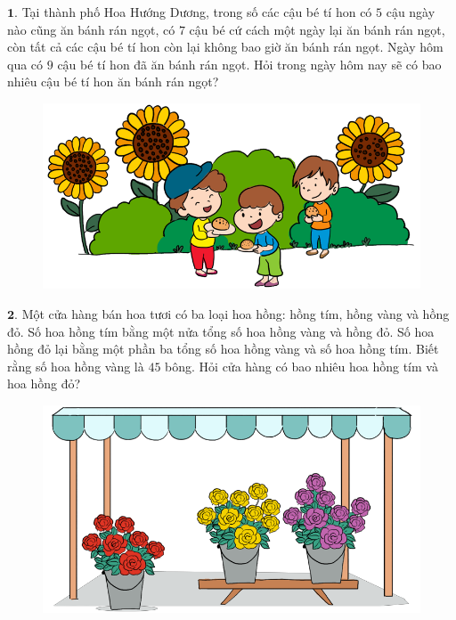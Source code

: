 \begin{multicols}{2}
	$\pmb{1.}$ 	Tại thành phố Hoa Hướng Dương, trong số các cậu bé tí hon có $5$ cậu ngày nào cũng ăn bánh rán ngọt, có $7$ cậu bé cứ cách một ngày lại ăn bánh rán ngọt, còn tất cả các cậu bé tí hon còn lại không bao giờ ăn bánh rán ngọt. Ngày hôm qua có $9$ cậu bé tí hon đã ăn bánh rán ngọt. Hỏi trong ngày hôm nay sẽ có bao nhiêu cậu bé tí hon ăn bánh rán ngọt?
	\begin{figure}[H]
		\centering
		\vspace*{-5pt}
		\captionsetup{labelformat= empty, justification=centering}
		\includegraphics[width=1\linewidth]{Pi9_bai1}
		\vspace*{-15pt}
	\end{figure}
	$\pmb{2.}$ Một cửa hàng bán hoa tươi có ba loại hoa hồng: hồng tím, hồng vàng và hồng đỏ. Số hoa hồng tím bằng một nửa tổng số hoa hồng vàng và hồng đỏ. Số hoa hồng đỏ lại bằng một phần ba tổng số hoa hồng vàng và số hoa hồng tím. Biết rằng số hoa hồng vàng là $45$ bông. Hỏi cửa hàng có bao nhiêu hoa hồng tím và hoa hồng đỏ?
	\begin{figure}[H]
		\centering
		\vspace*{-5pt}
		\captionsetup{labelformat= empty, justification=centering}
		\includegraphics[width=1\linewidth]{Pi9_bai2}

\end{figure}
\end{multicols}
